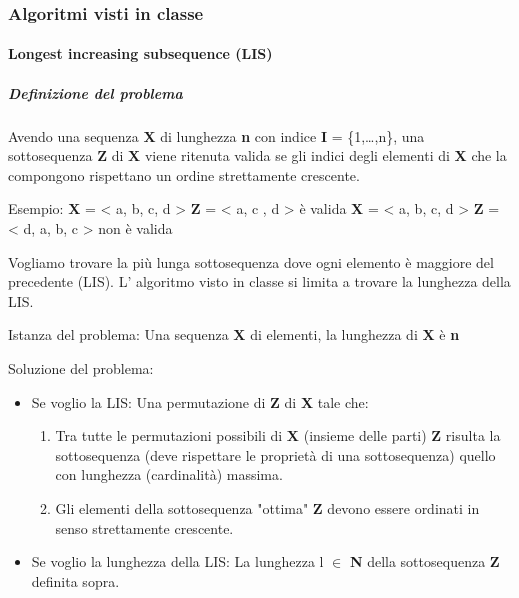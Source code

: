 \documentclass[11pt]{article}
\begin{document}
\subsubsection{Algoritmi visti in classe}
\label{sec:org7ccef44}

\paragraph{Longest increasing subsequence (LIS)}
\label{sec:org25a4380}

\subparagraph{Definizione del problema}
\label{sec:org11ea320}

Avendo una sequenza \textbf{X} di lunghezza \textbf{n} con indice \textbf{I} = \{1,\ldots{},n\}, \newline
una sottosequenza \textbf{Z} di \textbf{X} viene ritenuta valida se gli indici degli elementi
di \textbf{X} che la compongono rispettano un ordine strettamente crescente. \newline

Esempio:
\textbf{X} = < a, b, c, d >  \textbf{Z} = < a, c , d > è valida \newline
\textbf{X} = < a, b, c, d >  \textbf{Z} = < d, a, b, c > non è valida \newline

Vogliamo trovare la più lunga sottosequenza dove ogni elemento è maggiore del precedente (LIS).\newline
L' algoritmo visto in classe si limita a trovare la lunghezza della LIS. \newline

Istanza del problema: \newline
Una sequenza \textbf{X} di elementi, la lunghezza di \textbf{X} è \textbf{n}

Soluzione del problema: \newline
\begin{itemize}
\item Se voglio la LIS: \newline 
Una permutazione di \textbf{Z} di \textbf{X} tale che:
\begin{enumerate}
\item Tra tutte le permutazioni possibili di \textbf{X} (insieme delle parti) \textbf{Z} risulta la sottosequenza (deve rispettare le proprietà di una sottosequenza) quello con lunghezza (cardinalità) massima.
\item Gli elementi della sottosequenza "ottima" \textbf{Z} devono essere ordinati in senso strettamente crescente.
\end{enumerate}

\item Se voglio la lunghezza della LIS: \newline
La lunghezza l \(\in\) \textbf{N} della sottosequenza \textbf{Z} definita sopra.
\end{itemize}
\end{document}

